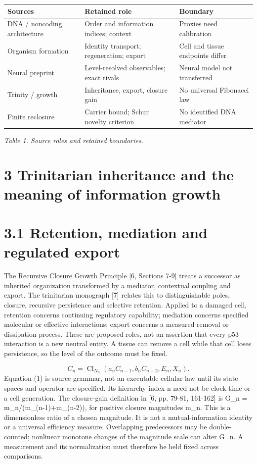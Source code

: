 \documentclass[11pt,a4paper]{article}
\begin{document}
\begin{longtable}{p{5.27cm}|p{5.27cm}|p{5.27cm}}
Sources & Retained role & Boundary\\\hline
[1,2] DNA / noncoding architecture & Order and information indices; context & Proxies need calibration\\\hline
[3,4] Organism formation & Identity transport; regeneration; export & Cell and tissue endpoints differ\\\hline
[5] Neural preprint & Level-resolved observables; exact rivals & Neural model not transferred\\\hline
[6,7] Trinity / growth & Inheritance, export, closure gain & No universal Fibonacci law\\\hline
[8,9] Finite reclosure & Carrier bound; Schur novelty criterion & No identified DNA mediator\\\hline
\end{longtable}{\small\itshape Table 1. Source roles and retained boundaries.\par}
\section*{3 Trinitarian inheritance and the meaning of information growth}
\section*{3.1 Retention, mediation and regulated export}
The Recursive Closure Growth Principle [6, Sections 7-9] treats a successor as inherited organization transformed by a mediator, contextual coupling and export. The trinitarian monograph [7] relates this to distinguishable poles, closure, recursive persistence and selective retention. Applied to a damaged cell, retention concerns continuing regulatory capability; mediation concerns specified molecular or effective interactions; export concerns a measured removal or dissipation process. These are proposed roles, not an assertion that every p53 interaction is a new neutral entity. A tissue can remove a cell while that cell loses persistence, so the level of the outcome must be fixed.

\begin{equation}C_n=\operatorname{Cl}_{N_n}(a_nC_{n-1},b_nC_{n-2},E_n,X_n).\tag{1}\end{equation}
Equation (1) is source grammar, not an executable cellular law until its state spaces and operator are specified. Its hierarchy index n need not be clock time or a cell generation. The closure-gain definition in [6, pp. 79-81, 161-162] is G\_n = m\_n/(m\_(n-1)+m\_(n-2)), for positive closure magnitudes m\_n. This is a dimensionless ratio of a chosen magnitude. It is not a mutual-information identity or a universal efficiency measure. Overlapping predecessors may be double-counted; nonlinear monotone changes of the magnitude scale can alter G\_n. A measurement and its normalization must therefore be held fixed across comparisons.
\end{document}
